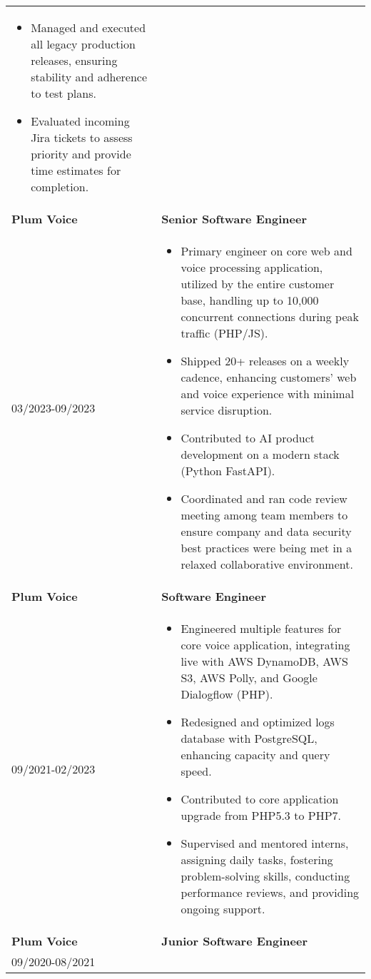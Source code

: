\documentclass[a4paper,10pt]{article}
\begin{document}
\begin{tabularx}{\linewidth}{l|>{\raggedright\arraybackslash}X}
\begin{itemize}[leftmargin=*]
    \item Managed and executed all legacy production releases, ensuring stability and adherence to test plans.
    \item Evaluated incoming Jira tickets to assess priority and provide time estimates for completion.
  \end{itemize} \\
  \textbf{\textcolor{blueishgray}{Plum Voice}} & \textbf{\textcolor{blueishgray}{Senior Software Engineer}} \\ {\small \textcolor{datecolor}{03/2023-09/2023}} &
  \begin{itemize}[leftmargin=*]
    \item Primary engineer on core web and voice processing application, utilized by the entire customer base, handling up to 10,000 concurrent connections during peak traffic (PHP/JS).
    \item Shipped 20+ releases on a weekly cadence, enhancing customers' web and voice experience with minimal service disruption.
    \item Contributed to AI product development on a modern stack (Python FastAPI).
    \item Coordinated and ran code review meeting among team members to ensure company and data security best practices were being met in a relaxed collaborative environment.
  \end{itemize} \\
  \textbf{\textcolor{blueishgray}{Plum Voice}} & \textbf{\textcolor{blueishgray}{Software Engineer}} \\ {\small \textcolor{datecolor}{09/2021-02/2023}} &
  \begin{itemize}[leftmargin=*]
    \item Engineered multiple features for core voice application, integrating live with AWS DynamoDB, AWS S3, AWS Polly, and Google Dialogflow (PHP).
    \item Redesigned and optimized logs database with PostgreSQL, enhancing capacity and query speed.
    \item Contributed to core application upgrade from PHP5.3 to PHP7.
    \item Supervised and mentored interns, assigning daily tasks, fostering problem-solving skills, conducting performance reviews, and providing ongoing support.
  \end{itemize} \\
  \textbf{\textcolor{blueishgray}{Plum Voice}} & \textbf{\textcolor{blueishgray}{Junior Software Engineer}} \\ {\small \textcolor{datecolor}{09/2020-08/2021}} &

\end{tabularx}
\end{document}
